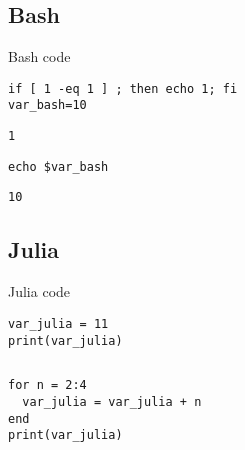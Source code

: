 \documentclass[%
oneside,                 %
final,                   %
chapterprefix=true,      %
open=right,              %
10pt]{book}
\begin{document}
\subsection{Bash}
Bash code




\begin{Verbatim}[numbers=none,fontsize=\fontsize{9pt}{9pt},baselinestretch=0.95]
if [ 1 -eq 1 ] ; then echo 1; fi
var_bash=10

\end{Verbatim}

\begin{Verbatim}[numbers=none,fontsize=\fontsize{9pt}{9pt},baselinestretch=0.95]
1
\end{Verbatim}



\begin{Verbatim}[numbers=none,fontsize=\fontsize{9pt}{9pt},baselinestretch=0.95]
echo $var_bash

\end{Verbatim}

\begin{Verbatim}[numbers=none,fontsize=\fontsize{9pt}{9pt},baselinestretch=0.95]
10
\end{Verbatim}

\subsection{Julia}

Julia code




\begin{Verbatim}[numbers=none,fontsize=\fontsize{9pt}{9pt},baselinestretch=0.95]
var_julia = 11
print(var_julia)

\end{Verbatim}

\begin{Verbatim}[numbers=none,fontsize=\fontsize{9pt}{9pt},baselinestretch=0.95]
\end{Verbatim}






\begin{Verbatim}[numbers=none,fontsize=\fontsize{9pt}{9pt},baselinestretch=0.95]
for n = 2:4
  var_julia = var_julia + n
end
print(var_julia)

\end{Verbatim}

\begin{Verbatim}[numbers=none,fontsize=\fontsize{9pt}{9pt},baselinestretch=0.95]
\end{Verbatim}
\end{document}
